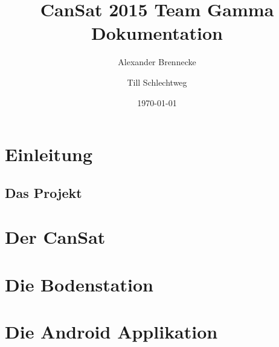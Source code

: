 \documentclass[11pt]{scrartcl}
\begin{document}
\title{CanSat 2015 Team Gamma Dokumentation}
\date{\today}
\author{Alexander Brennecke \and Till Schlechtweg}
\maketitle

\newpage

\tableofcontents 

\newpage

\section{Einleitung}


\subsection{Das Projekt}

\newpage
\section{Der CanSat}

\newpage
\section{Die Bodenstation}

\newpage
\section{Die Android Applikation}
\end{document}
